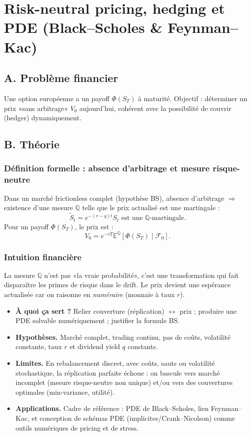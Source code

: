 \documentclass[11pt,a4paper]{report}
\theoremstyle{definition}
\theoremstyle{plain}
\theoremstyle{remark}
\newcommand{\E}{\mathbb{E}}
\newcommand{\1}{\mathbf{1}}
\newcommand{\Qmeas}{\mathbb{Q}}
\newcommand{\F}{\mathcal{F}}
\newcommand{\qa}[4]{
\begin{itemize}[leftmargin=*]
\item \textbf{À quoi ça sert ?} #1
\item \textbf{Hypothèses.} #2
\item \textbf{Limites.} #3
\item \textbf{Applications.} #4
\end{itemize}
}
\begin{document}
\chapter{Risk-neutral pricing, hedging et PDE (Black--Scholes \& Feynman--Kac)}

\section{A. Problème financier}
Une option européenne a un payoff $\Phi(S_T)$ à maturité. Objectif : déterminer un prix «sans arbitrage» $V_0$ aujourd'hui, cohérent avec la possibilité de couvrir (hedger) dynamiquement.

\section{B. Théorie}
\subsection*{Définition formelle : absence d'arbitrage et mesure risque-neutre}
Dans un marché frictionless complet (hypothèse BS), absence d'arbitrage $\Rightarrow$ existence d'une mesure $\Qmeas$ telle que le prix actualisé est une martingale :
\[
\tilde S_t = e^{-(r-q)t}S_t \text{ est une $\Qmeas$-martingale}.
\]
Pour un payoff $\Phi(S_T)$, le prix est :
\[
V_0 = e^{-rT}\E^{\Qmeas}[\Phi(S_T)\mid \F_0].
\]

\subsection*{Intuition financière}
La mesure $\Qmeas$ n'est pas «la vraie probabilité», c'est une transformation qui fait disparaître les primes de risque dans le drift. Le prix devient une espérance actualisée car on raisonne en \emph{numéraire} (monnaie à taux $r$).

\qa
{Relier couverture (réplication) $\leftrightarrow$ prix ; produire une PDE solvable numériquement ; justifier la formule BS.}
{Marché complet, trading continu, pas de coûts, volatilité constante, taux $r$ et dividend yield $q$ constants.}
{En rebalancement discret, avec coûts, sauts ou volatilité stochastique, la réplication parfaite échoue : on bascule vers marché incomplet (mesure risque-neutre non unique) et/ou vers des couvertures optimales (min-variance, utilité).}
{Cadre de référence : PDE de Black--Scholes, lien Feynman--Kac, et conception de schémas PDE (implicites/Crank--Nicolson) comme outils numériques de pricing et de stress.}
\end{document}
